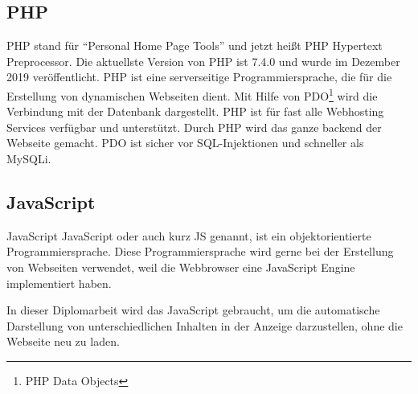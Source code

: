 
\subsection{PHP}
PHP stand f\"{u}r \textquotedblleft{}Personal Home Page Tools\textquotedblright{} und jetzt hei\ss{}t PHP Hypertext Preprocessor. Die aktuellste Version von PHP ist 7.4.0 und wurde im Dezember 2019 ver\"{o}ffentlicht. PHP ist eine serverseitige Programmiersprache, die f\"{u}r die Erstellung von dynamischen Webseiten dient. Mit Hilfe von PDO\footnote{PHP Data Objects} wird die Verbindung mit der Datenbank dargestellt. PHP ist f\"{u}r fast alle Webhosting Services verf\"{u}gbar und unterst\"{u}tzt. 
Durch PHP wird das ganze backend der Webseite gemacht. PDO ist sicher vor SQL-Injektionen und schneller als MySQLi. \cite{40_php}





\subsection{JavaScript}
JavaScript JavaScript oder auch kurz JS genannt, ist ein objektorientierte Programmiersprache. Diese Programmiersprache wird gerne bei der Erstellung von Webseiten verwendet, weil die Webbrowser eine JavaScript Engine implementiert haben. \cite{40_js}

In dieser Diplomarbeit wird das JavaScript gebraucht, um die automatische Darstellung von unterschiedlichen Inhalten in der Anzeige darzustellen, ohne die Webseite neu zu laden.





